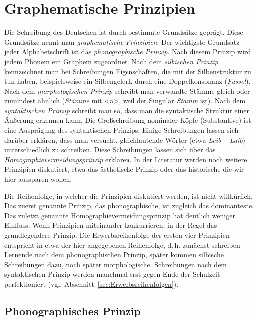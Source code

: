 \section{Graphematische Prinzipien}\label{sec:GraphPrin}
Die Schreibung des Deutschen ist durch bestimmte Grundsätze geprägt. Diese Grundsätze nennt man \textit{graphematische Prinzipien}. Der wichtigste Grundsatz jeder Alphabetschrift ist das \textit{phonographische Prinzip}. Nach diesem Prinzip wird jedem Phonem ein Graphem zugeordnet. Nach dem \textit{silbischen Prinzip} kennzeichnet man bei Schreibungen Eigenschaften, die mit der Silbenstruktur zu tun haben, beispielsweise ein Silbengelenk durch eine Doppelkonsonanz (\zB \textit{Fussel}). Nach dem \textit{morphologischen Prinzip} schreibt man verwandte Stämme gleich oder zumindest ähnlich (\zB \textit{Stämme} mit <ä>, weil der Singular \textit{Stamm} ist). Nach dem \textit{syntaktischen Prinzip} schreibt man so, dass man die syntaktische Struktur einer Äußerung erkennen kann. Die Großschreibung nominaler Köpfe (Substantive) ist eine Ausprägung des syntaktischen Prinzips. Einige Schreibungen lassen sich darüber erklären, dass man versucht, gleichlautende Wörter (etwa \textit{Leib -- Laib}) unterschiedlich zu schreiben. Diese Schreibungen lassen sich über das \textit{Homographievermeidungsprinzip} erklären. In der Literatur werden noch weitere Prinzipien diskutiert, etwa das ästhetische Prinzip oder das historische \citep[88--98]{Nerius2007} die wir hier aussparen wollen.

Die Reihenfolge, in welcher die Prinzipien diskutiert werden, ist nicht willkürlich. Das zuerst genannte Prinzip, das phonographische, ist zugleich das dominanteste. Das zuletzt genannte Homographievermeidungsprinzip hat deutlich weniger Einfluss. Wenn Prinzipien miteinander konkurrieren,  in der Regel das grundlegendere Prinzip. Die Erwerbsreihenfolge der ersten vier Prinzipien entspricht in etwa der hier angegebenen Reihenfolge, d.\,h. zunächst schreiben Lernende nach dem phonographischen Prinzip, später kommen silbische Schreibungen dazu, noch später morphologische. Schreibungen nach dem syntaktischen Prinzip werden manchmal erst gegen Ende der Schulzeit perfektioniert (vgl. Abschnitt~\ref{sec:Erwerbsreihenfolgen}). 


\subsection{Phonographisches Prinzip}
\label{Absatz_phon_prin}


